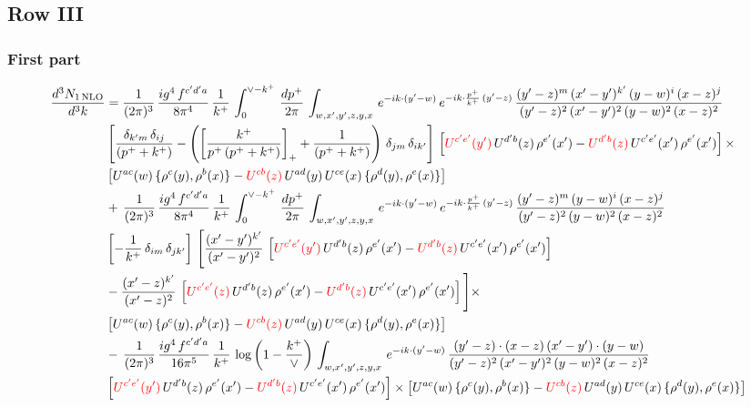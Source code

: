 \documentclass[9pt]{article}
\numberwithin{equation}{section}
\begin{document}
 \subsection{Row III}
\subsubsection{First part}
\begin{align}
     \frac{d^{3}N_{1\,\rm NLO}}{d^{3}k} & =  \frac{1}{(2\pi)^{3}}\, \frac{ig^{4}\,f^{c'd'a}}{8\pi^{4}}\, \frac{1}{k^{+}}\,\int_{0}^{\vee-k^{+}}\,  \frac{dp^{+}}{2\pi}\, \int_{w,x',y',z,y,x}\, e^{-ik\cdot (y'-w)}\, e^{-ik\cdot \frac{p^{+}}{k^{+}}\,(y'-z)}\,\frac{(y'-z)^{m}\,(x'-y')^{k'}\,(y-w)^{i}\,(x-z)^{j}}{(y'-z)^{2}\,(x'-y')^{2}\,(y-w)^{2}\,(x-z)^{2}}\notag \\ & \left[\frac{\delta_{k'm}\,\delta_{ij}}{(p^{+}+k^{+})}-\left(\left[\frac{k^{+}}{p^{+}\,(p^{+}+k^{+})}\right]_{+}+\frac{1}{(p^{+}+k^{+})}\right)\,\delta_{jm}\,\delta_{ik'}\right]\, \left[{\color{red}U^{c'e'}(y')}\,U^{d'b}(z)\,\rho^{e'}(x')-{\color{red}U^{d'b}(z)}\,U^{c'e'}(x')\,\rho^{e'}(x')\right]\times\notag \\ &  \left[U^{ac}(w)\, \{\rho^{c}(y),\rho^{b}(x)\}-{\color{red}U^{cb}(z)}\,U^{ad}(y)\,U^{ce}(x)\,\{\rho^{d}(y),\rho^{e}(x)\}\right] \notag \\
&  +\,\frac{1}{(2\pi)^{3}}\, \frac{ig^{4}\,f^{c'd'a}}{8\pi^{4}}\, \frac{1}{k^{+}}\,\int_{0}^{\vee-k^{+}}\,  \frac{dp^{+}}{2\pi}\, \int_{w,x',y',z,y,x}\, e^{-ik\cdot (y'-w)}\, e^{-ik\cdot \frac{p^{+}}{k^{+}}\,(y'-z)}\,\frac{(y'-z)^{m}\,(y-w)^{i}\,(x-z)^{j}}{(y'-z)^{2}\,(y-w)^{2}\,(x-z)^{2}}\notag \\ &   \left[-\frac{1}{k^{+}}\, \delta_{im}\, \delta_{jk'}\right]\, \Bigg[\frac{(x'-y')^{k'}}{(x'-y')^{2}}\,\left[{\color{red}U^{c'e'}(y')}\,U^{d'b}(z)\,\rho^{e'}(x')-{\color{red}U^{d'b}(z)}\,U^{c'e'}(x')\,\rho^{e'}(x')\right]\notag \\ & -\frac{(x'-z)^{k'}}{(x'-z)^{2}}\,\left[{\color{red}U^{c'e'}(z)}\,U^{d'b}(z)\,\rho^{e'}(x')-{\color{red}U^{d'b}(z)}\,U^{c'e'}(x')\,\rho^{e'}(x')\right]\Bigg]\times\notag \\ &   \left[U^{ac}(w)\, \{\rho^{c}(y),\rho^{b}(x)\}-{\color{red}U^{cb}(z)}\,U^{ad}(y)\,U^{ce}(x)\,\{\rho^{d}(y),\rho^{e}(x)\}\right] \notag \\
& -\,\frac{1}{(2\pi)^{3}}\, \frac{ig^{4}\,f^{c'd'a}}{16\pi^{5}}\, \frac{1}{k^{+}}\,\log{\left(1-\frac{k^{+}}{\vee}\right)}\, \int_{w,x',y',z,y,x}\, e^{-ik\cdot (y'-w)}\,\frac{(y'-z)\cdot (x-z)\,(x'-y')\cdot (y-w)}{(y'-z)^{2}\,(x'-y')^{2}\,(y-w)^{2}\,(x-z)^{2}}\notag \\ &  \left[{\color{red}U^{c'e'}(y')}\,U^{d'b}(z)\,\rho^{e'}(x')-{\color{red}U^{d'b}(z)}\,U^{c'e'}(x')\,\rho^{e'}(x')\right]\times  \left[U^{ac}(w)\, \{\rho^{c}(y),\rho^{b}(x)\}-{\color{red}U^{cb}(z)}\,U^{ad}(y)\,U^{ce}(x)\,\{\rho^{d}(y),\rho^{e}(x)\}\right]
\end{align}
\end{document}
